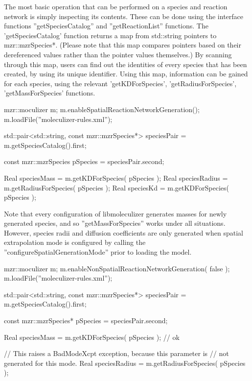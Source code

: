 The most basic operation that can be performed on a species and
reaction network is simply inspecting its contents.  These can be done
using the interface functions ''getSpeciesCatalog'' and
''getReactionList'' functions.  The 'getSpeciesCatalog' function
returns a map from std::string pointers to mzr::mzrSpecies*.  (Please
note that this map compares pointers based on their dereferenced
values rather than the pointer values themselves.)  By scanning
through this map, users can find out the identities of every species
that has been created, by using its unique identifier.  Using this
map, information can be gained for each species, using the relevant
'getKDForSpecies', 'getRadiusForSpecies', 'getMassForSpecies'
functions.  

\begin{ExampleCPP}[caption=Finding spatial properties of a species
  using moleculizer]
mzr::moculizer m;
m.enableSpatialReactionNetworkGeneration();
m.loadFile(''moleculizer-rules.xml'');

std::pair<std::string, const mzr::mzrSpecies*> speciesPair =
m.getSpeciesCatalog().first;

const mzr::mzrSpecies pSpecies = speciesPair.second;

Real speciesMass = m.getKDForSpecies( pSpecies );
Real speciesRadius = m.getRadiusForSpecies( pSpecies );
Real speciesKd = m.getKDForSpecies( pSpecies );
\end{ExampleCPP}

Note that every configuration of libmoleculizer generates masses for
newly generated species, and so ''getMassForSpecies'' works under all
situations.  However, species radii and diffusion coefficients are
only generated when spatial extrapolation mode is configured by
calling the ''configureSpatialGenerationMode'' prior to loading the
model.  

\begin{ExampleCPP}[caption=Finding out information about species in
  non-spatial mode]
mzr::moculizer m;
m.enableNonSpatialReactionNetworkGeneration( false );
m.loadFile(''moleculizer-rules.xml'');

std::pair<std::string, const mzr::mzrSpecies*> speciesPair =
m.getSpeciesCatalog().first;

const mzr::mzrSpecies* pSpecies = speciesPair.second;

Real speciesMass = m.getKDForSpecies( pSpecies ); // ok

// This raises a BadModeXcpt exception, because this parameter is 
// not generated for this mode.
Real speciesRadius = m.getRadiusForSpecies( pSpecies ); 
\end{ExampleCPP}

